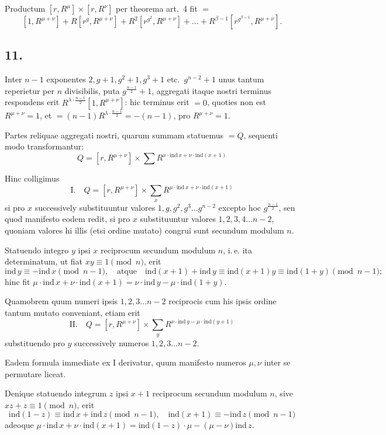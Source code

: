 \documentclass[12pt,a4paper]{article}
\begin{document}
Productum $[r, R^\mu] \times [r, R^\nu]$ per theorema art.\ 4 fit $=$
\[
[1, R^{\mu+\nu}] + R[r^{g}, R^{\mu+\nu}] + R^2[r^{g^2}, R^{\mu+\nu}] + \ldots + R^{\beta-1}[r^{g^{\beta-1}}, R^{\mu+\nu}].
\]

\subsection*{11.}

Inter $n-1$ exponentes $2, g+1, g^2+1, g^3+1$ etc.\ $g^{n-2}+1$ unus tantum reperietur per $n$ divisibilis, puta $g^{\frac{n-1}{2}}+1$, aggregati itaque nostri terminus respondens erit $R^{\lambda\cdot\frac{n-1}{2}}[1, R^{\mu+\nu}]$: hic terminus erit $=0$, quoties non est $R^{\mu+\nu}=1$, et $=(n-1)R^{\lambda\cdot\frac{n-1}{2}} = -(n-1)$, pro $R^{\mu+\nu}=1$.

Partes reliquae aggregati nostri, quarum summam statuemus $=Q$, sequenti modo transformantur:
\[
Q = [r, R^{\mu+\nu}] \times \sum R^{x\cdot\text{ind}\,x + \nu\cdot\text{ind}(x+1)}
\]

Hinc colligimus
\[
\text{I.}\quad Q = [r, R^{\mu+\nu}] \times \sum_{x} R^{\mu\cdot\text{ind}\,x + \nu\cdot\text{ind}(x+1)}
\]
si pro $x$ successively substituuntur valores $1, g, g^2, g^3\ldots g^{n-2}$ excepto hoc $g^{\frac{n-1}{2}}$, sen quod manifesto eodem redit, si pro $x$ substituuntur valores $1, 2, 3, 4\ldots n-2$, quoniam valores hi illis (etsi ordine mutato) congrui sunt secundum modulum $n$.

Statuendo integro $y$ ipsi $x$ reciprocum secundum modulum $n$, i.\,e. ita determinatum, ut fiat $xy \equiv 1 \pmod{n}$, erit
\[
\text{ind}\,y \equiv -\text{ind}\,x \pmod{n-1}, \quad \text{atque}\quad \text{ind}(x+1) + \text{ind}\,y \equiv \text{ind}(x+1)y \equiv \text{ind}(1+y) \pmod{n-1};
\]
hinc fit $\mu\cdot\text{ind}\,x + \nu\cdot\text{ind}(x+1) = \nu\cdot\text{ind}\,y - \mu\cdot\text{ind}(1+y)$.

Quamobrem quum numeri ipsis $1, 2, 3\ldots n-2$ reciprocis cum his ipsis ordine tantum mutato conveniant, etiam erit
\[
\text{II.}\quad Q = [r, R^{\mu+\nu}] \times \sum_{y} R^{\nu\cdot\text{ind}\,y - \mu\cdot\text{ind}(y+1)}
\]
substituendo pro $y$ successively numeros $1, 2, 3\ldots n-2$.

Eadem formula immediate ex I derivatur, quum manifesto numeros $\mu, \nu$ inter se permutare liceat.

Denique statuendo integrum $z$ ipsi $x+1$ reciprocum secundum modulum $n$, sive $xz + z \equiv 1 \pmod{n}$, erit
\[
\text{ind}(1-z) \equiv \text{ind}\,x + \text{ind}\,z \pmod{n-1}, \quad \text{ind}(x+1) \equiv -\text{ind}\,z \pmod{n-1}
\]
adeoque $\mu\cdot\text{ind}\,x + \nu\cdot\text{ind}(x+1) = \text{ind}(1-z)\cdot\mu - (\mu-\nu)\text{ind}\,z$.
\end{document}
